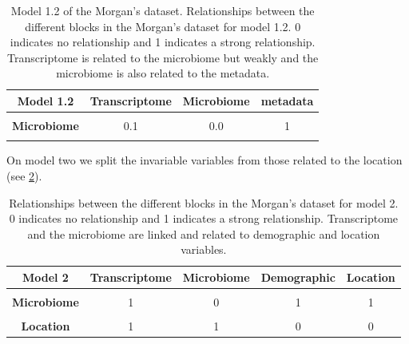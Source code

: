 \documentclass[
  12pt,
  a4paper,
  twoside,
  openright]{book}
\begin{document}
\begin{table}[H]

\caption[Model 1.2 of the Morgan's dataset.]{\label{tab:morgan-model1-2}Model 1.2 of the Morgan's dataset. Relationships between the different blocks in the Morgan's dataset for model 1.2. 0 indicates no relationship and 1 indicates a strong relationship.  Transcriptome is related to the microbiome but weakly and the microbiome is also related to the metadata.}
\centering
\begin{tabular}[t]{>{}c|c|c|c}
\hline
\textbf{Model 1.2} & \textbf{Transcriptome} & \textbf{Microbiome} & \textbf{metadata}\\
\hline
\textbf{\cellcolor{gray!6}{Transcriptome}} & \cellcolor{gray!6}{0.0} & \cellcolor{gray!6}{0.1} & \cellcolor{gray!6}{0}\\
\hline
\textbf{Microbiome} & 0.1 & 0.0 & 1\\
\hline
\textbf{\cellcolor{gray!6}{metadata}} & \cellcolor{gray!6}{0.0} & \cellcolor{gray!6}{1.0} & \cellcolor{gray!6}{0}\\
\hline
\end{tabular}
\end{table}

On model two we split the invariable variables from those related to the location (see \ref{tab:morgan-model2}).

\begin{table}[H]

\caption[Model 2 of the Morgan's dataset.]{\label{tab:morgan-model2}Relationships between the different blocks in the Morgan's dataset for model 2. 0 indicates no relationship and 1 indicates a strong relationship. Transcriptome and the microbiome are linked and related to demographic and location variables.}
\centering
\begin{tabular}[t]{>{}c|c|c|c|c}
\hline
\textbf{Model 2} & \textbf{Transcriptome} & \textbf{Microbiome} & \textbf{Demographic} & \textbf{Location}\\
\hline
\textbf{\cellcolor{gray!6}{Transcriptome}} & \cellcolor{gray!6}{0} & \cellcolor{gray!6}{1} & \cellcolor{gray!6}{1} & \cellcolor{gray!6}{1}\\
\hline
\textbf{Microbiome} & 1 & 0 & 1 & 1\\
\hline
\textbf{\cellcolor{gray!6}{Demographic}} & \cellcolor{gray!6}{1} & \cellcolor{gray!6}{1} & \cellcolor{gray!6}{0} & \cellcolor{gray!6}{0}\\
\hline
\textbf{Location} & 1 & 1 & 0 & 0\\
\hline
\end{tabular}
\end{table}
\end{document}
